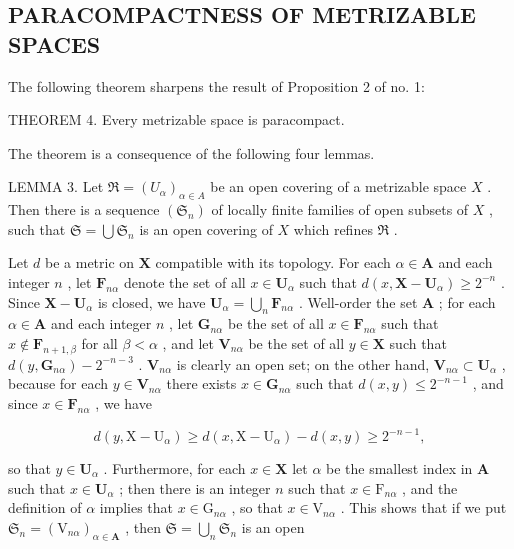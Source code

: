 \subsection{PARACOMPACTNESS OF METRIZABLE SPACES}

The following theorem sharpens the result of Proposition 2 of no. 1:

THEOREM 4. Every metrizable space is paracompact.

The theorem is a consequence of the following four lemmas.

LEMMA 3. Let \(\Re = (U_{\alpha})_{\alpha \in A}\) be an open covering of a metrizable space \(X\) . Then there is a sequence \((\mathfrak{S}_n)\) of locally finite families of open subsets of \(X\) , such that \(\mathfrak{S} = \bigcup \mathfrak{S}_n\) is an open covering of \(X\) which refines \(\Re\) .

Let \(d\) be a metric on \(\mathbf{X}\) compatible with its topology. For each \(\alpha \in \mathbf{A}\) and each integer \(n\) , let \(\mathbf{F}_{n\alpha}\) denote the set of all \(x \in \mathbf{U}_{\alpha}\) such that \(d(x, \mathbf{X} - \mathbf{U}_{\alpha}) \geqslant 2^{-n}\) . Since \(\mathbf{X} - \mathbf{U}_{\alpha}\) is closed, we have \(\mathbf{U}_{\alpha} = \bigcup_{n} \mathbf{F}_{n\alpha}\) . Well-order the set \(\mathbf{A}\) ; for each \(\alpha \in \mathbf{A}\) and each integer \(n\) , let \(\mathbf{G}_{n\alpha}\) be the set of all \(x \in \mathbf{F}_{n\alpha}\) such that \(x \notin \mathbf{F}_{n+1,\beta}\) for all \(\beta < \alpha\) , and let \(\mathbf{V}_{n\alpha}\) be the set of all \(y \in \mathbf{X}\) such that \(d(y, \mathbf{G}_{n\alpha}) - 2^{-n-3}\) . \(\mathbf{V}_{n\alpha}\) is clearly an open set; on the other hand, \(\mathbf{V}_{n\alpha} \subset \mathbf{U}_{\alpha}\) , because for each \(y \in \mathbf{V}_{n\alpha}\) there exists \(x \in \mathbf{G}_{n\alpha}\) such that \(d(x, y) \leqslant 2^{-n-1}\) , and since \(x \in \mathbf{F}_{n\alpha}\) , we have

\[
d (y, \mathrm{X} - \mathrm{U} _ {\alpha}) \geqslant d (x, \mathrm{X} - \mathrm{U} _ {\alpha}) - d (x, y) \geqslant 2 ^ {- n - 1},
\]

so that \(y \in \mathbf{U}_{\alpha}\) . Furthermore, for each \(x \in \mathbf{X}\) let \(\alpha\) be the smallest index in \(\mathbf{A}\) such that \(x \in \mathbf{U}_{\alpha}\) ; then there is an integer \(n\) such that \(x \in \mathrm{F}_{n\alpha}\) , and the definition of \(\alpha\) implies that \(x \in \mathrm{G}_{n\alpha}\) , so that \(x \in \mathrm{V}_{n\alpha}\) . This shows that if we put \(\mathfrak{S}_n = (\mathrm{V}_{n\alpha})_{\alpha \in \mathbf{A}}\) , then \(\mathfrak{S} = \bigcup_{n} \mathfrak{S}_n\) is an open

